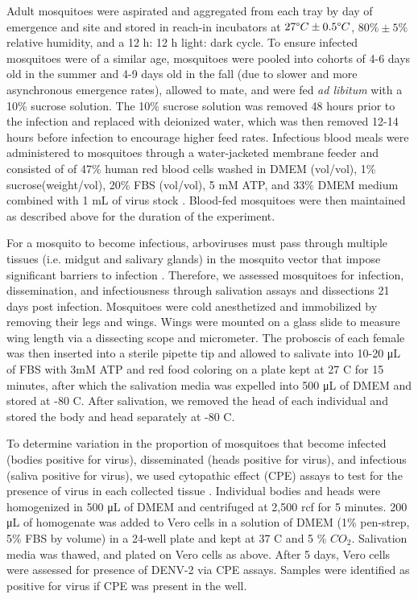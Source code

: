\documentclass[12pt]{article}
\begin{document}
Adult mosquitoes were aspirated and aggregated from each tray by day of emergence and site and stored in reach-in incubators at $27 \degree C \pm 0.5 \degree C$, $80\% \pm 5\%$ relative humidity, and a 12 h: 12 h light: dark cycle. To ensure infected mosquitoes were of a similar age, mosquitoes were pooled into cohorts of 4-6 days old in the summer and 4-9 days old in the fall (due to slower and more asynchronous emergence rates), allowed to mate, and were fed \textit{ad libitum} with a 10\% sucrose solution. The 10\% sucrose solution was removed 48 hours prior to the infection and replaced with deionized water, which was then removed 12-14 hours before infection to encourage higher feed rates. Infectious blood meals were administered to mosquitoes through a water-jacketed membrane feeder and consisted of of 47\% human red blood cells washed in DMEM (vol/vol), 1\% sucrose(weight/vol), 20\% FBS (vol/vol), 5 mM ATP, and 33\% DMEM medium combined with 1 mL of virus stock \citep{shan2016}. Blood-fed mosquitoes were then maintained as described above for the duration of the experiment.

For a mosquito to become infectious, arboviruses must pass through multiple tissues (i.e. midgut and salivary glands) in the mosquito vector that impose significant barriers to infection \citep{cheng2016}. Therefore, we assessed mosquitoes for infection, dissemination, and infectiousness through salivation assays and dissections \citep{hurlbut1966,anderson2010} 21 days post infection. Mosquitoes were cold anesthetized and immobilized by removing their legs and wings. Wings were mounted on a glass slide to measure wing length via a dissecting scope and micrometer. The proboscis of each female was then inserted into a sterile pipette tip and allowed to salivate into 10-20 \si{\micro\liter} of FBS with 3mM ATP and red food coloring on a plate kept at 27 \degree C for 15 minutes, after which the salivation media was expelled into 500 \si{\micro\liter} of DMEM and stored at -80 \degree C. After salivation, we removed the head of each individual and stored the body and head separately at -80 \degree C.

To determine variation in the proportion of mosquitoes that become infected (bodies positive for virus), disseminated (heads positive for virus), and infectious (saliva positive for virus), we used cytopathic effect (CPE) assays to test for the presence of virus in each collected tissue \citep{balaya1969}. Individual bodies and heads were homogenized in 500 \si{\micro\liter} of DMEM and centrifuged at 2,500 rcf for 5 minutes. 200 \si{\micro\liter} of homogenate was added to Vero cells in a solution of DMEM (1\% pen-strep, 5\% FBS by volume) in a 24-well plate and kept at 37 \degree C and 5 \% ${CO_2}$. Salivation media was thawed, and plated on Vero cells as above. After 5 days, Vero cells were assessed for presence of DENV-2 via CPE assays. Samples were identified as positive for virus if CPE was present in the well.
\end{document}
